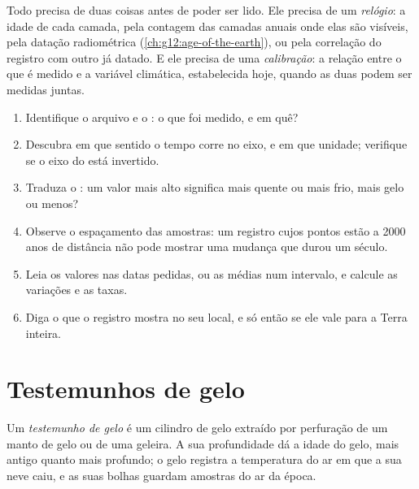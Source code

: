 Todo  precisa de duas coisas antes de poder ser lido. Ele precisa
de um \emph{relógio}: a idade de cada camada, pela contagem das camadas
anuais onde elas são visíveis, pela datação radiométrica
(\cref{ch:g12:age-of-the-earth}), ou pela correlação do registro com outro
já datado. E ele precisa de uma \emph{calibração}: a relação entre o que é
medido e a variável climática, estabelecida hoje, quando as duas podem ser
medidas juntas.

\begin{method}
\begin{enumerate}
  \item Identifique o arquivo e o : o que foi medido, e em quê?
  \item Descubra em que sentido o tempo corre no eixo, e em que unidade;
        verifique se o eixo do  está invertido.
  \item Traduza o : um valor mais alto significa mais quente ou
        mais frio, mais gelo ou menos?
  \item Observe o espaçamento das amostras: um registro cujos pontos estão a
        \num{2000} anos de distância não pode mostrar uma mudança que durou
        um século.
  \item Leia os valores nas datas pedidas, ou as médias num intervalo, e
        calcule as variações e as taxas.
  \item Diga o que o registro mostra no seu local, e só então se ele vale
        para a Terra inteira.
\end{enumerate}
\end{method}

\section{Testemunhos de gelo}

\begin{definition}\label{def:g12:past-climates:ice-core}
Um \emph{testemunho de gelo} é um cilindro de gelo
extraído por perfuração de um manto de gelo ou de uma geleira. A sua
profundidade dá a idade do gelo, mais antigo quanto mais profundo; o gelo
registra a temperatura do ar em que a sua neve caiu, e as suas bolhas
guardam amostras do ar da época.
\end{definition}


